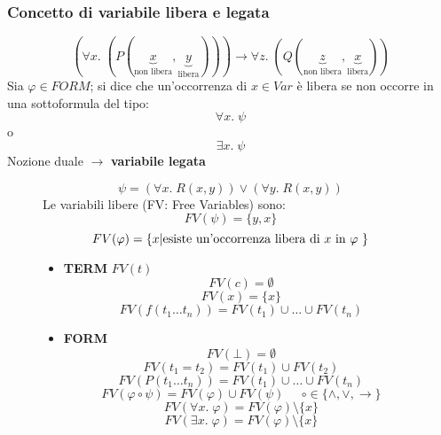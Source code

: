 \documentclass{article}
\theoremstyle{break}
\theoremstyle{break}
\theoremstyle{break}
\theoremstyle{break}
\begin{document}
\subsubsection{Concetto di variabile libera e legata}
\[
  (\forall x.\; (P(\underbrace{x}_{\text{non libera}},\underbrace{y}_{\text{libera}}))) \to \forall z.\; (Q(\underbrace{z}_{\text{non libera}},\underbrace{x}_{\text{libera}}))
\] 
Sia \( \varphi \in FORM \); si dice che un'occorrenza di \( x \in Var \) è libera se non occorre
in una sottoformula del tipo:
\[ \forall x.\; \psi \] o \[ \exists x.\; \psi \] 
Nozione duale \( \to  \) \textbf{variabile legata}
\begin{figure}[H]
  \begin{example}
    \[
    \psi = (\forall x.\; R(x,y)) \vee (\forall y.\; R(x,y))
    \] 
    Le variabili libere (FV: Free Variables) sono:
    \[
    FV(\psi) = \{y,x\}
    \] 
    \[
    FV(\varphi) = \{x | \text{esiste un'occorrenza libera di \( x \) in \( \varphi \) }\} 
    \] 
  \end{example}
\end{figure}

\begin{figure}[H]
  \begin{definition}
    \begin{itemize}
      \item \textbf{TERM} \( FV(t) \) 
        \[
        FV(c) = \emptyset
        \] 
        \[
        FV(x) = \{x\} 
        \] 
        \[
        FV(f(t_1 \ldots t_n)) = FV(t_1) \cup \ldots \cup FV(t_n)
        \] 
      \item \textbf{FORM}
        \[
        FV(\bot) = \emptyset
        \] 
        \[
        FV(t_1 = t_2) = FV(t_1) \cup FV(t_2)
        \] 
        \[
        FV(P(t_1 \ldots t_n)) = FV(t_1) \cup \ldots \cup FV(t_n)
        \] 
        \[
        FV(\varphi \circ \psi) = FV(\varphi) \cup FV(\psi) \;\;\;\;\; \circ \in \{\wedge, \vee, \to \}
        \] 
        \[
        FV(\forall x.\; \varphi) = FV(\varphi) \setminus \{x\}
        \] 
        \[
        FV(\exists x.\; \varphi) = FV(\varphi) \setminus \{x\}
        \] 
    \end{itemize} 
  \end{definition}
\end{figure}
\end{document}
